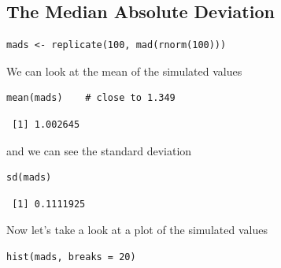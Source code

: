 \documentclass[captions=tableheading]{scrbook}
\begin{document}
\subsection{The Median Absolute Deviation}
\label{sec-8-5-2}



\lstset{language=R}
\begin{lstlisting}
mads <- replicate(100, mad(rnorm(100)))
\end{lstlisting}

We can look at the mean of the simulated values


\lstset{language=R}
\begin{lstlisting}
mean(mads)    # close to 1.349
\end{lstlisting}

\begin{verbatim}
 [1] 1.002645
\end{verbatim}

and we can see the standard deviation


\lstset{language=R}
\begin{lstlisting}
sd(mads)
\end{lstlisting}

\begin{verbatim}
 [1] 0.1111925
\end{verbatim}

Now let's take a look at a plot of the simulated values


\lstset{language=R}
\begin{lstlisting}
hist(mads, breaks = 20)
\end{lstlisting}
\end{document}
